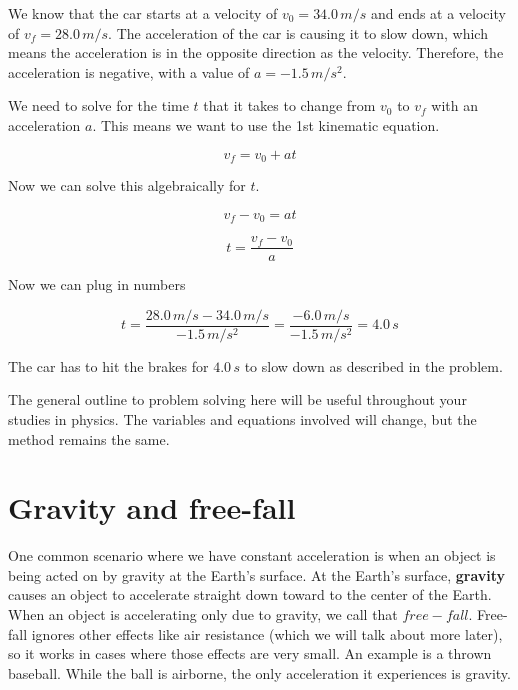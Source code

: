 \documentclass[12pt]{book}
\begin{document}
We know that the car starts at a velocity of $v_0 = 34.0 \, m/s$ and ends at a velocity of $v_f = 28.0 \, m/s$. The acceleration of the car is causing it to slow down, which means the acceleration is in the opposite direction as the velocity. Therefore, the acceleration is negative, with a value of $a = -1.5 \, m/s^2$.

We need to solve for the time $t$ that it takes to change from $v_0$ to $v_f$ with an acceleration $a$. This means we want to use the 1st kinematic equation.

\begin{equation}
v_f = v_0 + at
\end{equation}

Now we can solve this algebraically for $t$.

\begin{equation}
v_f - v_0 = at
\end{equation}

\begin{equation}
t = \frac{v_f - v_0}{a}
\end{equation}

Now we can plug in numbers

\begin{equation}
t = \frac{28.0 \, m/s - 34.0 \, m/s}{-1.5 \, m/s^2} = \frac{-6.0 \, m/s}{-1.5 \, m/s^2} = 4.0 \, s
\end{equation}

The car has to hit the brakes for $4.0 \, s$ to slow down as described in the problem. 

\linespace

The general outline to problem solving here will be useful throughout your studies in physics. The variables and equations involved will change, but the method remains the same.

\section{Gravity and free-fall}
\label{gravsec}

One common scenario where we have constant acceleration is when an object is being acted on by gravity at the Earth's surface. At the Earth's surface, \textbf{gravity} causes an object to accelerate straight down toward to the center of the Earth. When an object is accelerating only due to gravity, we call that $free-fall$. Free-fall ignores other effects like air resistance (which we will talk about more later), so it works in cases where those effects are very small. An example is a thrown baseball. While the ball is airborne, the only acceleration it experiences is gravity. 
\end{document}
